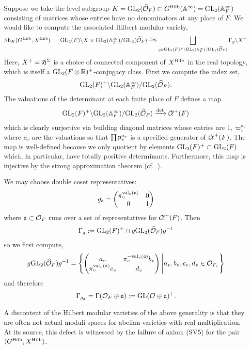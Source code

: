 \documentclass[main.tex]{subfiles}
\begin{document}
\begin{example}
Suppose we take the level subgroup $K = \mathrm{GL}_2(\widehat{\mathcal{O}}_F) \subset G^{\operatorname{\mathrm{Hilb}}}(\mathbb{A}^{\infty}) = \mathrm{GL}_2(\mathbb{A}^{\infty}_F)$ consisting of matrices whose entries have no denominators at any place of $F$. We would like to compute the associated Hilbert modular variety,
\[ \Sh_K(G^{\Hilb}, X^{\Hilb}) := \GL_2(F) \backslash X \times \GL_2(\A^{\infty}_F) / \GL_2(\widehat{\cO}_F) \iso \bigsqcup_{g \in \GL_2(F)^+ \backslash \GL_2(\A^{\infty}_F) / \GL_2(\widehat{\cO}_F)} \Gamma_g \backslash X^+ \] 
Here, $X^+ = \mathfrak{H}^{\Sigma}$ is a choice of connected component of $X^{\operatorname{\mathrm{Hilb}}}$ in the real topology, which is itself a $\mathrm{GL}_2(F \otimes \mathbb{R})^+$-conjugacy class. First we compute the index set,
\[ \mathrm{GL}_2(F)^+ \backslash \mathrm{GL}_2(\mathbb{A}^{\infty}_F) / \mathrm{GL}_2(\widehat{\mathcal{O}}_F). \]
The valuations of the determinant at each finite place of $F$ defines a map
\[ \mathrm{GL}_2(F)^+ \backslash \mathrm{GL}_2(\mathbb{A}^{\infty}_F) / \mathrm{GL}_2(\widehat{\mathcal{O}}_F) \xrightarrow{\det} \operatorname{\mathcal{C}\!{\ell}}^+(F) \]
which is clearly surjective via building diagonal matrices whose entries are $1, \varpi_v^{a_v}$ where $a_v$ are the valuations so that $\prod \mathfrak{p}_v^{a_v}$ is a specified generator of $\operatorname{\mathcal{C}\!{\ell}}^+(F)$. The map is well-defined because we only quotient by elements $\mathrm{GL}_2(F)^+ \subset \mathrm{GL}_2(F)$ which, in particular, have totally positive determinants.
Furthermore, this map is injective by the strong approximation theorem (cf.\ \cite[Theorem~4.16]{milne:shimura_varieties}). 
\par 
We may choose double coset representatives:
\[ g_{\mathfrak{a}} = \begin{pmatrix}
\pi_v^{\mathrm{val}_v(\mathfrak{a})} & 0
\\
0 & 1
\end{pmatrix} \]
where $\mathfrak{a} \subset \mathcal{O}_F$ runs over a set of representatives for $\operatorname{\mathcal{C}\!{\ell}}^+(F)$. Then
\[ \Gamma_g := \mathrm{GL}_2(F)^+ \cap g \mathrm{GL}_2(\widehat{\mathcal{O}}_F) g^{-1} \]
so we first compute,
\[ g \mathrm{GL}_2(\widehat{\mathcal{O}}_F) g^{-1}
= \left \{ 
\begin{pmatrix}
a_v & \pi_v^{-\mathrm{val}_v(\mathfrak{a})} b_v 
\\
\pi_v^{\mathrm{val}_v(\mathfrak{a})} c_v & d_v 
\end{pmatrix} \: \middle| a_v, b_v, c_v, d_v \in \mathcal{O}_{F_v} \right\} \]
and therefore
\[ \Gamma_{g_{\mathfrak{a}}} = \Gamma(\mathcal{O}_F \oplus \mathfrak{a}) := \mathrm{GL}(\mathcal{O} \oplus \mathfrak{a})^+. \]
\end{example}

A discontent of the Hilbert modular varieties of the above generality is that they are often not actual moduli spaces for abelian varieties with real multiplication. At its source, this defect is witnessed by the failure of axiom (SV5) for the pair $(G^{\operatorname{\mathrm{Hilb}}}, X^{\operatorname{\mathrm{Hilb}}})$. 
\end{document}
